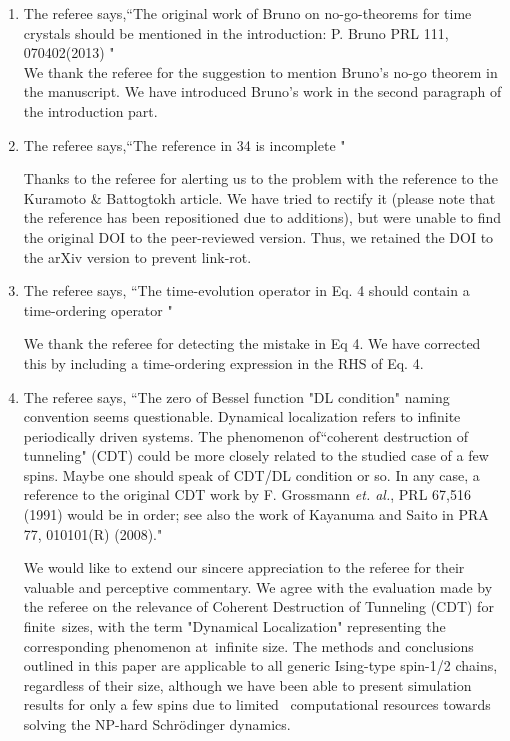 \documentclass[aps,prb,reprint,showpacs,floatfix,superscriptaddress, onecolumn, nofootinbib, 9pt]{revtex4-2}
\newcommand{\ar}[1]{{\color{blue}#1}} %
\begin{document}
\begin{enumerate}
\item The referee says,``The original work of Bruno on no-go-theorems for time crystals should be mentioned in the introduction: P. Bruno PRL 111, 070402(2013) "\\

\ar{
We thank the referee for the suggestion to mention Bruno's no-go theorem in the manuscript. We have introduced Bruno's work in the second paragraph of the introduction part.
}
\item The referee says,``The reference in 34 is incomplete "

\ar{    	
Thanks to the referee for alerting us to the problem with the reference to the Kuramoto \& Battogtokh article. We have tried to rectify it (please note that the reference has been repositioned due to additions), but were unable to find the original DOI to the peer-reviewed version. Thus, we retained the DOI to the arXiv version to prevent link-rot.}

\item The referee says, ``The time-evolution operator in Eq. 4 should contain a time-ordering operator "

\ar{
We thank the referee for detecting the mistake in Eq 4. We have corrected this by including a time-ordering expression in the RHS of Eq. 4.
}

\item The referee says, ``The zero of Bessel function "DL condition" naming convention seems questionable. Dynamical localization refers to infinite periodically driven systems. The phenomenon of``coherent destruction of tunneling" (CDT) could be more closely related to the studied case of a few spins. Maybe one should speak of CDT/DL condition or so. In any case, a reference to the original CDT work by F. Grossmann \textit{et. al.}, PRL 67,516 (1991) would be in order; see also the work of Kayanuma and Saito in PRA 77, 010101(R) (2008)."\\

\ar{
We would like to extend our sincere appreciation to the referee for their valuable and perceptive commentary. We agree with the evaluation made by the referee on the relevance of Coherent Destruction of Tunneling (CDT) for  finite sizes, with the term "Dynamical Localization" representing the corresponding phenomenon at infinite size. The methods and conclusions outlined in this paper are applicable to all generic Ising-type spin-1/2 chains, regardless of their size, although we have been able to present simulation results for only a few spins due to limited  computational resources towards solving the NP-hard Schr\"odinger dynamics.

}
\end{enumerate}
\end{document}
